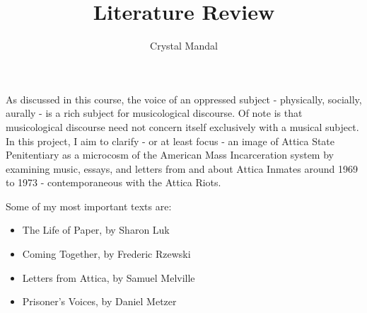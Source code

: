 \documentclass[12pt,letterpaper]{article}
\title{\vspace*{-72pt}Literature Review}
\author{Crystal Mandal}
\date{}
\begin{document}
\maketitle

As discussed in this course, the voice of an oppressed subject - physically, 
socially, aurally - is a rich subject for musicological discourse. Of note is 
that musicological discourse need not concern itself exclusively with a 
musical subject. In this project, I aim to clarify - or at least focus - an 
image of Attica State Penitentiary as a microcosm of the American Mass Incarceration 
system by examining music, essays, and letters from and about Attica Inmates around 
1969 to 1973 - contemporaneous with the Attica Riots. 

Some of my most important texts are: 

\begin{itemize}

	\item The Life of Paper, by Sharon Luk\\
	
	\clearpage
	
	\item Coming Together, by Frederic Rzewski\\

	\item Letters from Attica, by Samuel Melville\\
	
	\item Prisoner's Voices, by Daniel Metzer\\

\end{itemize}
\end{document}
